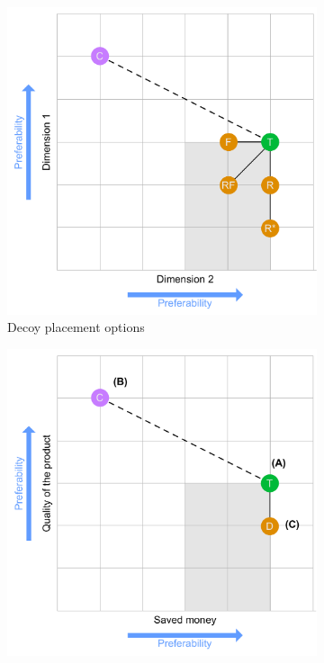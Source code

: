\begin{figure}[t]
	\begin{subfigure}[t]{0.49\textwidth}
		\includegraphics[width=\textwidth]{figures/decoy/decoy-dimensions-general}
		\caption{Decoy placement options \cite{Huber1982AsymetricallyDominated}}
		\label{fig:decoy:general-construction} 
	\end{subfigure}
	\begin{subfigure}[t]{0.49\textwidth}
		\includegraphics[width=\textwidth]{figures/decoy/decoy-dimensions-beer}

\end{subfigure}
\end{figure}
